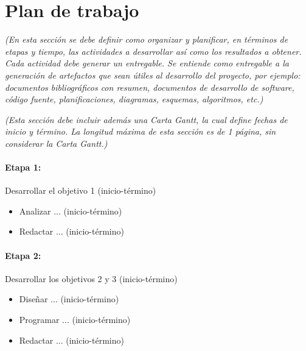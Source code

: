 \documentclass[11pt,letterpaper]{article}
\begin{document}
\section{Plan de trabajo}
\emph{(En esta sección se debe definir como organizar y planificar, en términos de etapas y tiempo, las actividades a desarrollar así como los resultados a obtener.  Cada actividad debe generar un entregable. Se entiende como entregable a la generación de artefactos que sean útiles al desarrollo del proyecto, por ejemplo: documentos bibliográficos con resumen, documentos de desarrollo de software, código fuente, planificaciones, diagramas, esquemas, algoritmos, etc.)}

\emph{(Esta sección debe incluir además una Carta Gantt, la cual define fechas de inicio y término. La longitud máxima de esta sección es de 1 página, sin considerar la Carta Gantt.)}

\paragraph{Etapa 1:} Desarrollar el objetivo 1 (inicio-término)
\begin{itemize}
\item Analizar ... (inicio-término)
\item Redactar ... (inicio-término)
\end{itemize}

\paragraph{Etapa 2:} Desarrollar los objetivos 2 y 3 (inicio-término)
\begin{itemize}
\item Diseñar ... (inicio-término)
\item Programar ... (inicio-término)
\item Redactar ... (inicio-término)
\end{itemize}





\end{document}
